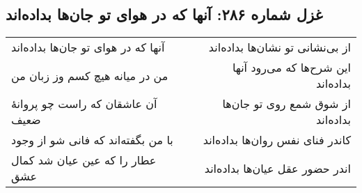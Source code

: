 \begin{center}
\section*{غزل شماره ۲۸۶: آنها که در هوای تو جان‌ها بداده‌اند}
\label{sec:286}
\begin{longtable}{l p{0.5cm} r}
آنها که در هوای تو جان‌ها بداده‌اند
&&
از بی‌نشانی تو نشان‌ها بداده‌اند
\\
من در میانه هیچ کسم وز زبان من
&&
این شرح‌ها که می‌رود آنها بداده‌اند
\\
آن عاشقان که راست چو پروانهٔ ضعیف
&&
از شوق شمع روی تو جان‌ها بداده‌اند
\\
با من بگفته‌اند که فانی شو از وجود
&&
کاندر فنای نفس روان‌ها بداده‌اند
\\
عطار را که عین عیان شد کمال عشق
&&
اندر حضور عقل عیان‌ها بداده‌اند
\\
\end{longtable}
\end{center}
